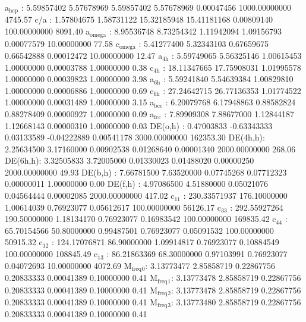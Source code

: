 \documentclass[11pt]{article}
\begin{document}
a\(_{\text{hcp}}\)   :   5.59857402   5.57678969   5.59857402   5.57678969   0.00047456 1000.00000000      4745.57
c/a     :   1.57804675   1.58731122  15.32185948  15.41181168   0.00809140 100.00000000      8091.40
a\(_{\text{omega}}\) :   8.95536748   8.73254342   1.11942094   1.09156793   0.00077579  10.00000000        77.58
c\(_{\text{omega}}\) :   5.41277400   5.32343103   0.67659675   0.66542888   0.00012472  10.00000000        12.47
a\(_{\text{4h}}\)    :   5.59749065   5.56325146   1.00615453   1.00000000   0.00003788   1.00000000         0.38
c\(_{\text{4h}}\)    :  18.11347665  17.75908031   1.01995578   1.00000000   0.00039823   1.00000000         3.98
a\(_{\text{6h}}\)    :   5.59241840   5.54639384   1.00829810   1.00000000   0.00006886   1.00000000         0.69
c\(_{\text{6h}}\)    :  27.24642715  26.77136353   1.01774522   1.00000000   0.00031489   1.00000000         3.15
a\(_{\text{bcc}}\)   :   6.20079768   6.17948863   0.88582824   0.88278409   0.00000927   1.00000000         0.09
a\(_{\text{fcc}}\)   :   7.89909308   7.88677000   1.12844187   1.12668143   0.00000310   1.00000000         0.03
DE(o,h) :   0.47003833  -0.63343333   0.03133589  -0.04222889   0.00541178 3000.00000000    162353.30
DE(4h,h):   2.25634500   3.17160000   0.00902538   0.01268640   0.00001340 2000.00000000       268.06
DE(6h,h):   3.32505833   3.72005000   0.01330023   0.01488020   0.00000250 2000.00000000        49.93
DE(b,h) :   7.66781500   7.63520000   0.07745268   0.07712323   0.00000011   1.00000000         0.00
DE(f,h) :   4.97086500   4.51880000   0.05021076   0.04564444   0.00002085 2000.00000000       417.02
c\(_{\text{11}}\)    : 230.33571937 176.10000000   1.00614039   0.76923077   0.05612617 100.00000000     56126.17
c\(_{\text{33}}\)    : 292.55927264 190.50000000   1.18134170   0.76923077   0.16983542 100.00000000    169835.42
c\(_{\text{44}}\)    :  65.70154566  50.80000000   0.99487501   0.76923077   0.05091532 100.00000000     50915.32
c\(_{\text{12}}\)    : 124.17076871  86.90000000   1.09914817   0.76923077   0.10884549 100.00000000    108845.49
c\(_{\text{13}}\)    :  86.21863369  68.30000000   0.97103991   0.76923077   0.04072693  10.00000000      4072.69
M\(_{\text{freq}}\)\(_{\text{0}}\):   3.13773477   2.85858719   0.22867756   0.20833333   0.00041389   0.10000000         0.41
M\(_{\text{freq}}\)\(_{\text{1}}\):   3.13773478   2.85858719   0.22867756   0.20833333   0.00041389   0.10000000         0.41
M\(_{\text{freq}}\)\(_{\text{2}}\):   3.13773478   2.85858719   0.22867756   0.20833333   0.00041389   0.10000000         0.41
M\(_{\text{freq}}\)\(_{\text{3}}\):   3.13773480   2.85858719   0.22867756   0.20833333   0.00041389   0.10000000         0.41
\end{document}
